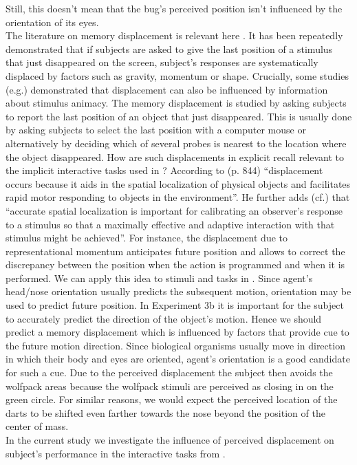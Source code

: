 \documentclass[10pt]{article}
\begin{document}
Still, this doesn't mean that the bug's perceived position isn't influenced by the orientation of its eyes.\\
The literature on memory displacement is relevant here \cite{hubbard05}. 
It has been repeatedly demonstrated that if subjects are asked to give the last position of a stimulus that just disappeared on the screen, subject's responses are systematically displaced by factors such as gravity, momentum or shape. 
Crucially, some studies (e.g.\cite{freyd92}) demonstrated that displacement can also be influenced by information about stimulus animacy. 
The memory displacement is studied by asking subjects to report the last position of an object that just disappeared.
This is usually done by asking subjects to select the last position with a computer mouse or alternatively by deciding which of several probes is nearest to the location where the object disappeared.
How are such displacements in explicit recall relevant to the implicit interactive tasks used in \cite{gao10}?
According to \cite{hubbard05} (p. 844) ``displacement occurs because it aids in the spatial localization of physical objects and facilitates rapid motor responding to objects in the environment''. 
He further adds (cf.) that ``accurate spatial localization is important for calibrating an observer's response to a stimulus so that a maximally effective and adaptive interaction with that stimulus might be achieved''. 
For instance, the displacement due to representational momentum anticipates future position and allows to correct the discrepancy between the position when the action is programmed and when it is performed. 
We can apply this idea to stimuli and tasks in \cite{gao10}. Since agent's head/nose orientation usually predicts the subsequent motion, orientation may be used to predict future position. 
In Experiment 3b it is important for the subject to accurately predict the direction of the object's motion. 
Hence we should predict a memory displacement which is influenced by factors that provide cue to the future motion direction. 
Since biological organisms usually move in direction in which their body and eyes are oriented, agent's orientation is a good candidate for such a cue.  
Due to the perceived displacement the subject then avoids the wolfpack areas because the wolfpack stimuli are perceived as closing in on the green circle. 
For similar reasons, we would expect the perceived location of the darts to be shifted even farther towards the nose beyond the position of the center of mass.\\
In the current study we investigate the influence of perceived displacement on subject's performance in the interactive tasks from \cite{gao10}. 
\end{document}
